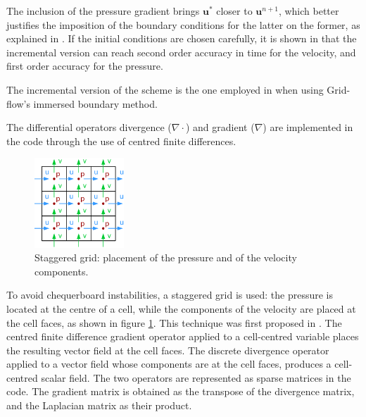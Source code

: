 \documentclass[11pt, a4paper, oneside, openany]{book}
\begin{document}
The inclusion of the pressure gradient brings $\boldsymbol{u}^{*}$ closer to $\boldsymbol{u}^{n+1}$, which better justifies the imposition of the boundary conditions for the latter on the former, as explained in \cite{Brown2001}. If the initial conditions are chosen carefully, it is shown in \cite{guermond2006overview} that the incremental version can reach second order accuracy in time for the velocity, and first order accuracy for the pressure.\par
The incremental version of the scheme is the one employed in \cite{Vittoz2018} when using Grid-flow's immersed boundary method.\par
The differential operators divergence ($\nabla\cdot$) and gradient ($\nabla$) are implemented in the code through the use of centred finite differences.
\begin{figure}[!ht]
	\centering
	\includegraphics[width=0.3\textwidth]{StaggeredGrid.pdf}
	\caption[Staggered Grid]{Staggered grid: placement of the pressure and of the velocity components.}
	\label{StaggeredGrid}
\end{figure}\noindent
To avoid chequerboard instabilities, a staggered grid is used: the pressure is located at the centre of a cell, while the components of the velocity are placed at the cell faces, as shown in figure \ref{StaggeredGrid}. This technique was first proposed in \cite{harlow1965numerical}. The centred finite difference gradient operator applied to a cell-centred variable places the resulting vector field at the cell faces. The discrete divergence operator applied to a vector field whose components are at the cell faces, produces a cell-centred scalar field. The two operators are represented as sparse matrices in the code. The gradient matrix is obtained as the transpose of the divergence matrix, and the Laplacian matrix as their product.
\end{document}
